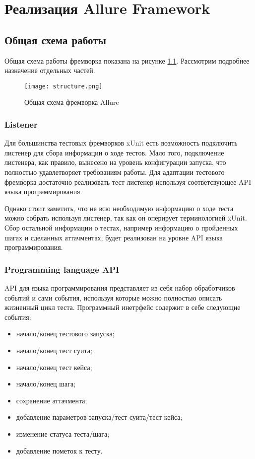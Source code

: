 \chapter{Реализация Allure Framework} 
\label{chapter3}

\section{Общая схема работы} 

Общая схема работы фремворка показана на рисунке \ref{fig:allure}. Рассмотрим подробнее назначение отдельных частей.

\begin{figure}[htb]
\centering
\texttt{[image: structure.png]}
\caption{Общая схема фремворка Allure}
\label{fig:allure}
\end{figure}

\subsection{Listener}

Для большинства тестовых фремворков xUnit есть возможность подключить листенер для сбора информации о ходе тестов. Мало того, подключение листенера, как правило, вынесено на уровень конфигурации запуска, что полностью удавлетворяет требованиям работы. Для адаптации тестового фремворка достаточно реализовать тест листенер используя соответсвующее API языка программирования.

Однако стоит заметить, что не всю необходимую информацию о ходе теста можно собрать используя листенер, так как он оперирует терминологией xUnit. Сбор остальной информации о тестах, например информацию о пройденных шагах и сделанных аттачментах, будет реализован на уровне API языка программирования.

\subsection{Programming language API}

API для языка программирования представляет из себя набор обработчиков событий и сами события, используя которые можно полностью описать жизненный цикл теста. Программный инетрфейс содержит в себе следующие события:

\begin{itemize}
\item начало/конец тестового запуска;
\item начало/конец тест суита;
\item начало/конец тест кейса;
\item начало/конец шага;
\item сохранение аттачмента;
\item добавление параметров запуска/тест суита/тест кейса;
\item изменение статуса теста/шага;
\item добавление пометок к тесту.
\end{itemize}

